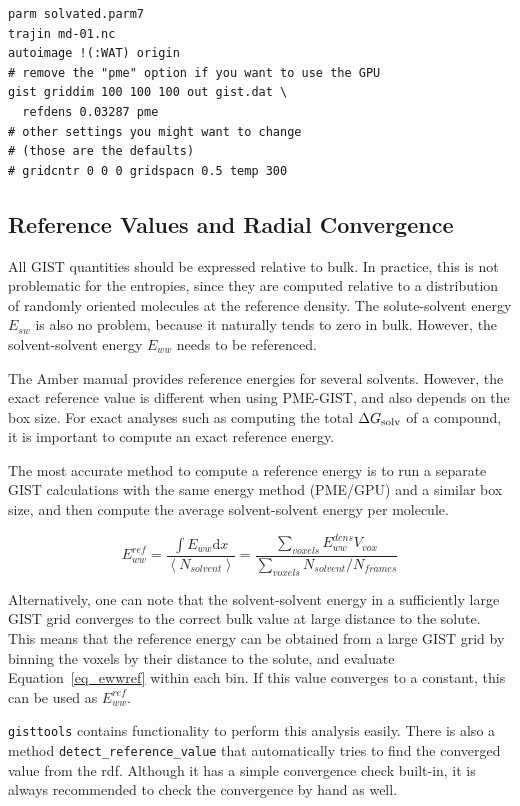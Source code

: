 \documentclass[9pt,tutorial]{livecoms}
\newcommand{\dgsolv}{\Delta G_\textup{solv}}
\newcommand{\software}{\texttt}
\newcommand\inlinecode{\texttt}
\begin{document}
\begin{lstlisting}
parm solvated.parm7
trajin md-01.nc
autoimage !(:WAT) origin
# remove the "pme" option if you want to use the GPU
gist griddim 100 100 100 out gist.dat \
  refdens 0.03287 pme
# other settings you might want to change
# (those are the defaults)
# gridcntr 0 0 0 gridspacn 0.5 temp 300
\end{lstlisting}
\subsection{Reference Values and Radial Convergence}
All GIST quantities should be expressed relative to bulk. In practice, this is not problematic for the entropies, since they are computed relative to a distribution of randomly oriented molecules at the reference density.
The solute-solvent energy $E_{sw}$ is also no problem, because it naturally tends to zero in bulk. 
However, the solvent-solvent energy $E_{ww}$ needs to be referenced.

The Amber manual provides reference energies for several solvents.
However, the exact reference value is different when using PME-GIST, and also depends on the box size.
For exact analyses such as computing the total $\dgsolv$ of a compound, it is important to compute an exact reference energy.

The most accurate method to compute a reference energy is to run a separate GIST calculations with the same energy method (PME/GPU) and a similar box size, and then compute the average solvent-solvent energy per molecule.

\begin{equation}
\label{eq_ewwref}
E_{ww}^\textit{ref} = \frac{\int{E_{ww}} \mathrm{d}x}{\left<N_\textit{solvent}\right>}
  = \frac{\sum_\textit{voxels}E_{ww}^\textit{dens} V_\textit{vox}}{\sum_\textit{voxels}{N_\textit{solvent}} / N_\textit{frames}}
\end{equation}

Alternatively, one can note that the solvent-solvent energy in a sufficiently large GIST grid converges to the correct bulk value at large distance to the solute.
This means that the reference energy can be obtained from a large GIST grid by binning the voxels by their distance to the solute, and evaluate Equation~\ref{eq_ewwref} within each bin.
If this value converges to a constant, this can be used as $E_{ww}^\textit{ref}$.

\software{gisttools} contains functionality to perform this analysis easily.
There is also a method \inlinecode{detect\_reference\_value} that automatically tries to find the converged value from the rdf.
Although it has a simple convergence check built-in, it is always recommended to check the convergence by hand as well.
\end{document}
